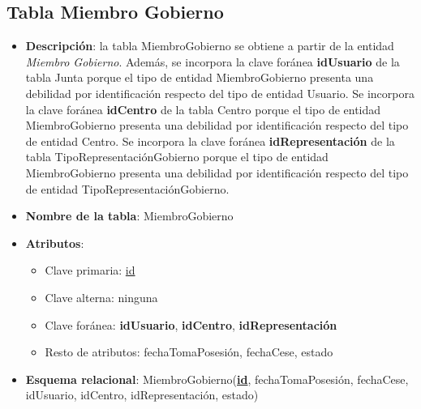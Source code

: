 \subsection{Tabla Miembro Gobierno}
    \begin{itemize}
        \item \textbf{Descripción}: la tabla MiembroGobierno se obtiene a partir de la entidad \textit{Miembro Gobierno}. Además, se incorpora la clave foránea \textbf{idUsuario} de la tabla Junta porque el tipo de entidad MiembroGobierno presenta una debilidad por identificación respecto del tipo de entidad Usuario. Se incorpora la clave foránea \textbf{idCentro} de la tabla Centro porque el tipo de entidad MiembroGobierno presenta una debilidad por identificación respecto del tipo de entidad Centro. Se incorpora la clave foránea \textbf{idRepresentación} de la tabla TipoRepresentaciónGobierno porque el tipo de entidad MiembroGobierno presenta una debilidad por identificación respecto del tipo de entidad TipoRepresentaciónGobierno.
        \item \textbf{Nombre de la tabla}: MiembroGobierno
        \item \textbf{Atributos}:
            \begin{itemize}
                \item Clave primaria: \underline{id}
                \item Clave alterna: ninguna
                \item Clave foránea: \textbf{idUsuario}, \textbf{idCentro}, \textbf{idRepresentación}
                \item Resto de atributos: fechaTomaPosesión, fechaCese, estado
            \end{itemize}
        \item \textbf{Esquema relacional}: 
            MiembroGobierno(\textbf{\underline{id}}, fechaTomaPosesión, fechaCese, idUsuario, idCentro, idRepresentación, estado)
    \end{itemize}

